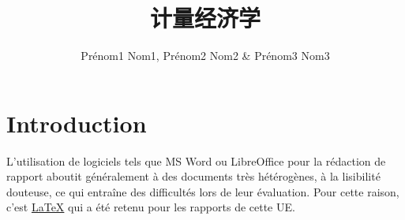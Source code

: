 \documentclass{ceri}
\title{计量经济学}
\author{
	Prénom1 Nom1, 
	Prénom2 Nom2 \&
	Prénom3 Nom3
}
\begin{document}
\maketitle

\MyToc

\sloppy          


\section{Introduction}
L'utilisation de logiciels tels que MS Word ou LibreOffice pour la rédaction de rapport aboutit généralement à des documents très hétérogènes, à la lisibilité douteuse, ce qui entraîne des difficultés lors de leur évaluation. Pour cette raison, c'est \href{http://fr.wikipedia.org/wiki/LaTeX}{\LaTeX} \cite{LaTeXProject2010, Wikipedia2011a} qui a été retenu pour les rapports de cette UE.
\end{document}
